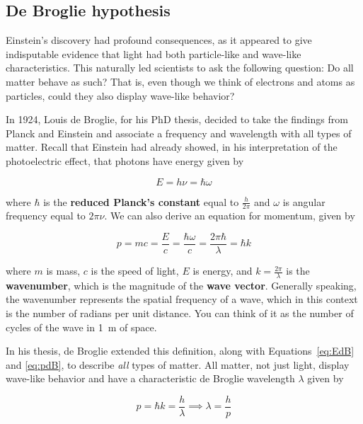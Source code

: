 
\subsection{De Broglie hypothesis} \label{sec:db-hyp}
Einstein's discovery had profound consequences, as it appeared to give indisputable evidence that light had both particle-like and wave-like characteristics. This naturally led scientists to ask the following question: Do all matter behave as such? That is, even though we think of electrons and atoms as particles, could they also display wave-like behavior? \par

In 1924, Louis de Broglie, for his PhD thesis, decided to take the findings from Planck and Einstein and associate a frequency and wavelength with all types of matter. Recall that Einstein had already showed, in his interpretation of the photoelectric effect, that photons have energy given by
\begin{tcolorbox}[title=Energy relationship] \vspace{-2ex}
	\begin{equation}
		E = h\nu = \hbar \omega \label{eq:EdB}
	\end{equation}
\end{tcolorbox}

where $\hbar$ is the \textbf{reduced Planck's constant} equal to $\frac{h}{2\pi}$ and $\omega$ is angular frequency equal to $2\pi\nu$. We can also derive an equation for momentum, given by
\begin{tcolorbox}[title=Momentum relationship] \vspace{-2ex}
	\begin{equation}
		p = mc = \frac{E}{c} = \frac{\hbar\omega}{c} = \frac{2\pi\hbar}{\lambda} = \hbar k \label{eq:pdB}
	\end{equation}
\end{tcolorbox}

where $m$ is mass, $c$ is the speed of light, $E$ is energy, and $k=\frac{2\pi}{\lambda}$ is the \textbf{wavenumber}, which is the magnitude of the \textbf{wave vector}. Generally speaking, the wavenumber represents the spatial frequency of a wave, which in this context is the number of radians per unit distance. You can think of it as the number of cycles of the wave in \SI{1}{\meter} of space. \par

In his thesis, de Broglie extended this definition, along with Equations~\ref{eq:EdB} and \ref{eq:pdB}, to describe \emph{all} types of matter. All matter, not just light, display wave-like behavior and have a characteristic de Broglie wavelength $\lambda$ given by
\begin{tcolorbox}[title=de Broglie wavelength] \vspace{-2ex}
	\begin{equation}
		p = \hbar k = \frac{h}{\lambda} \implies \lambda = \frac{h}{p} \label{dBw}
	\end{equation}
\end{tcolorbox}


